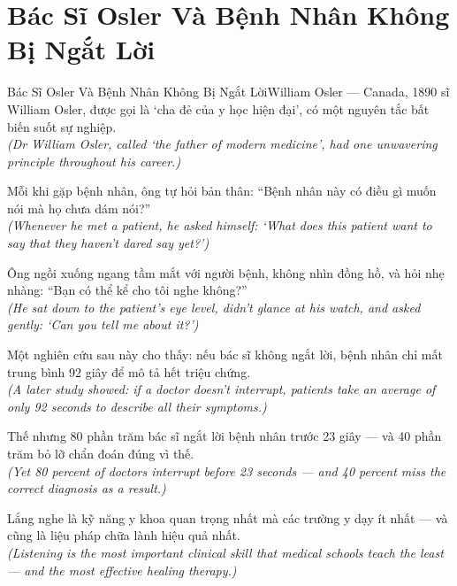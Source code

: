 \section{Bác Sĩ Osler Và Bệnh Nhân Không Bị Ngắt Lời}
\begin{truyen}{Bác Sĩ Osler Và Bệnh Nhân Không Bị Ngắt Lời}{William Osler --- Canada, 1890}
 sĩ William Osler, được gọi là `cha đẻ của y học hiện đại', có một nguyên tắc bất biến suốt sự nghiệp.\\[4pt]
\textit{(Dr William Osler, called `the father of modern medicine', had one unwavering principle throughout his career.)}

Mỗi khi gặp bệnh nhân, ông tự hỏi bản thân: ``Bệnh nhân này có điều gì muốn nói mà họ chưa dám nói?''\\[4pt]
\textit{(Whenever he met a patient, he asked himself: `What does this patient want to say that they haven't dared say yet?')}

Ông ngồi xuống ngang tầm mắt với người bệnh, không nhìn đồng hồ, và hỏi nhẹ nhàng: ``Bạn có thể kể cho tôi nghe không?''\\[4pt]
\textit{(He sat down to the patient's eye level, didn't glance at his watch, and asked gently: `Can you tell me about it?')}

Một nghiên cứu sau này cho thấy: nếu bác sĩ không ngắt lời, bệnh nhân chỉ mất trung bình 92 giây để mô tả hết triệu chứng.\\[4pt]
\textit{(A later study showed: if a doctor doesn't interrupt, patients take an average of only 92 seconds to describe all their symptoms.)}

Thế nhưng 80 phần trăm bác sĩ ngắt lời bệnh nhân trước 23 giây --- và 40 phần trăm bỏ lỡ chẩn đoán đúng vì thế.\\[4pt]
\textit{(Yet 80 percent of doctors interrupt before 23 seconds --- and 40 percent miss the correct diagnosis as a result.)}

\end{truyen}
\begin{baihoc}
  Lắng nghe là kỹ năng y khoa quan trọng nhất mà các trường y dạy ít nhất --- và cũng là liệu pháp chữa lành hiệu quả nhất.\\[4pt]
  \textit{(Listening is the most important clinical skill that medical schools teach the least --- and the most effective healing therapy.)}
\end{baihoc}

